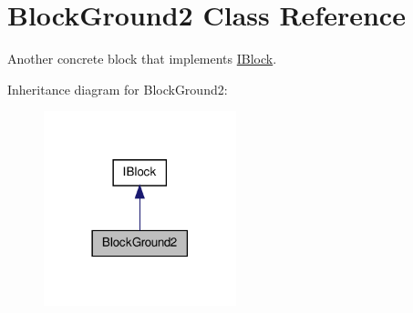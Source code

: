 \hypertarget{class_block_ground2}{\section{Block\-Ground2 Class Reference}
\label{class_block_ground2}
}


Another concrete block that implements \hyperlink{class_i_block}{I\-Block}.  




Inheritance diagram for Block\-Ground2\-:\nopagebreak
\begin{figure}[H]
\begin{center}
\leavevmode
\includegraphics[width=158pt]{class_block_ground2__inherit__graph}
\end{center}
\end{figure}
